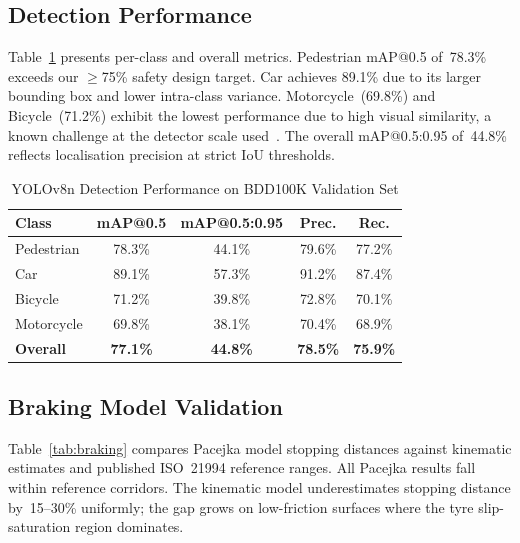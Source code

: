 \documentclass[journal]{IEEEtran}
\begin{document}
\subsection{Detection Performance}

Table~\ref{tab:detection} presents per-class and overall metrics.
Pedestrian mAP@0.5 of~78.3\% exceeds our $\ge$75\% safety design
target.
Car achieves 89.1\% due to its larger bounding box and lower
intra-class variance.
Motorcycle~(69.8\%) and Bicycle~(71.2\%) exhibit the lowest performance
due to high visual similarity, a known challenge at the detector scale
used~\cite{geronimo2010}.
The overall mAP@0.5:0.95 of~44.8\% reflects localisation precision at
strict IoU thresholds.

\begin{table}[t]
  \caption{YOLOv8n Detection Performance on BDD100K Validation Set}
  \label{tab:detection}
  \centering
  \small
  \begin{tabular}{lcccc}
    \toprule
    \textbf{Class} &
    \textbf{mAP@0.5} &
    \textbf{mAP@0.5:0.95} &
    \textbf{Prec.} &
    \textbf{Rec.}\\
    \midrule
    Pedestrian  & 78.3\% & 44.1\% & 79.6\% & 77.2\%\\
    Car         & 89.1\% & 57.3\% & 91.2\% & 87.4\%\\
    Bicycle     & 71.2\% & 39.8\% & 72.8\% & 70.1\%\\
    Motorcycle  & 69.8\% & 38.1\% & 70.4\% & 68.9\%\\
    \midrule
    \textbf{Overall} & \textbf{77.1\%} & \textbf{44.8\%} &
                       \textbf{78.5\%} & \textbf{75.9\%}\\
    \bottomrule
  \end{tabular}
\end{table}

\subsection{Braking Model Validation}

Table~\ref{tab:braking} compares Pacejka model stopping distances
against kinematic estimates and published ISO~21994 reference ranges.
All Pacejka results fall within reference corridors.
The kinematic model underestimates stopping distance by~15--30\%
uniformly; the gap grows on low-friction surfaces where the tyre
slip-saturation region dominates.
\end{document}
